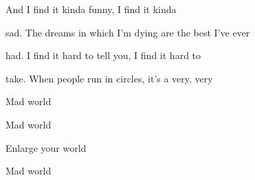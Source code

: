 \begin{song}
\bigskip

 And I find it kinda funny, I find it kinda \par
{}sad. The dreams in which I'm dying are the best I've ever \par
{}had. I find it hard to tell you, I find it hard to \par
{}take. When people run in circles, it's a very, very \par
{} Mad world \par
{} Mad world \par
{} Enlarge your world \par
{} Mad world \par

\end{song}

